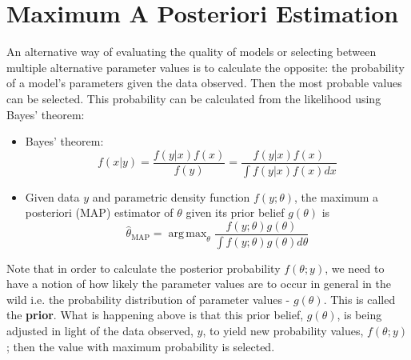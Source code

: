 \documentclass{article}
\DeclareMathOperator*{\argmax}{arg\,max}
\begin{document}
\section{Maximum A Posteriori Estimation}
An alternative way of evaluating the quality of models or selecting between multiple alternative parameter values is to calculate the opposite: the probability of a model's parameters given the data observed. Then the most probable values can be selected. This probability can be calculated from the likelihood using Bayes' theorem:
\begin{itemize}
    \item Bayes' theorem:
    \begin{equation}
        f(x|y) = \frac{f(y|x)f(x)}{f(y)} = \frac{f(y|x)f(x)}{\int f(y|x)f(x)dx}
    \end{equation}
    \item Given data $y$ and parametric density function $f(y; \theta)$, the maximum a posteriori (MAP) estimator of $\theta$ given its prior belief $g(\theta)$ is
    \begin{equation}
        \hat{\theta}_{\text{MAP}} = \argmax_{\theta}\frac{f(y; \theta)g(\theta)}{\int f(y; \theta)g(\theta)d\theta}
    \end{equation}
\end{itemize}
Note that in order to calculate the posterior probability $f(\theta;y)$, we need to have a notion of how likely the parameter values are to occur in general in the wild i.e. the probability distribution of parameter values - $g(\theta)$. This is called the \textbf{prior}. What is happening above is that this prior belief, $g(\theta)$, is being adjusted in light of the data observed, $y$, to yield new probability values, $f(\theta;y)$; then the value with maximum probability is selected.
\end{document}
